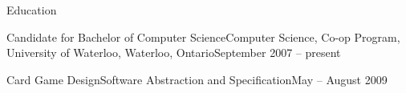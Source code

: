 \documentclass[11pt]{article}
\begin{document}
\begin{section}{Education}
\begin{subsection}{Candidate for Bachelor of Computer Science}{Computer Science, Co-op Program, University of Waterloo, Waterloo, Ontario}{September 2007 -- present}
\begin{indent}
\begin{subsection}{Card Game Design}{Software Abstraction and Specification}{May -- August 2009}
                \end{subsection}

            \end{indent}

        \end{subsection}

    \end{section}
\end{document}
